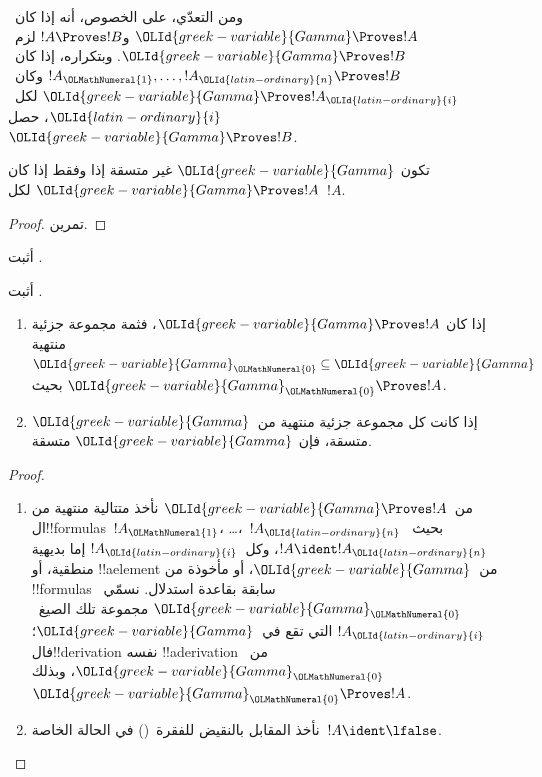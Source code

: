 \documentclass[../../../include/open-logic-section]{subfiles}
\begin{document}
ومن التعدّي، على الخصوص، أنه إذا كان~${\OLId{greek-variable}{Gamma}} \Proves !A$ و$!A
\Proves !B$ لزم~${\OLId{greek-variable}{Gamma}} \Proves !B$. وبتكراره، إذا كان~$!A_{\OLMathNumeral{1}},
\dots, !A_{\OLId{latin-ordinary}{n}} \Proves !B$ وكان~${\OLId{greek-variable}{Gamma}} \Proves !A_{\OLId{latin-ordinary}{i}}$ لكل~${\OLId{latin-ordinary}{i}}$،
حصل~${\OLId{greek-variable}{Gamma}} \Proves !B$.


\begin{prop}
تكون ${\OLId{greek-variable}{Gamma}}$ غير متسقة إذا وفقط إذا كان ${\OLId{greek-variable}{Gamma}} \Proves !A$ لكل~$!A$.
\end{prop}

\begin{proof}
تمرين.
\end{proof}

\begin{prob}
أثبت .
\end{prob}
\tagendprob

\begin{prob}
أثبت .
\end{prob}
\tagendprob

\begin{prop}[التراص]
  \begin{enumerate}
  \item إذا كان ${\OLId{greek-variable}{Gamma}} \Proves !A$، فثمة مجموعة جزئية منتهية ${\OLId{greek-variable}{Gamma}}_{\OLMathNumeral{0}}
    \subseteq {\OLId{greek-variable}{Gamma}}$ بحيث ${\OLId{greek-variable}{Gamma}}_{\OLMathNumeral{0}} \Proves !A$.
  \item إذا كانت كل مجموعة جزئية منتهية من~${\OLId{greek-variable}{Gamma}}$ متسقة، فإن
    ${\OLId{greek-variable}{Gamma}}$ متسقة.
  \end{enumerate}
\end{prop}

\begin{proof}
  \begin{enumerate}
    \item من~${\OLId{greek-variable}{Gamma}} \Proves !A$ نأخذ متتالية منتهية من
      ال!!{formula}s~$!A_{\OLMathNumeral{1}}$، \dots،~$!A_{\OLId{latin-ordinary}{n}}$ بحيث~$!A \ident !A_{\OLId{latin-ordinary}{n}}$،
      وكل~$!A_{\OLId{latin-ordinary}{i}}$ إما بديهية منطقية، أو !!a{element} من~${\OLId{greek-variable}{Gamma}}$،
      أو مأخوذة من !!{formula}s سابقة بقاعدة استدلال.
      نسمّي~${\OLId{greek-variable}{Gamma}}_{\OLMathNumeral{0}}$ مجموعة تلك الصيغ~$!A_{\OLId{latin-ordinary}{i}}$ التي تقع
      في~${\OLId{greek-variable}{Gamma}}$؛ فال!!{derivation} نفسه !!a{derivation}
      من~${\OLId{greek-variable}{Gamma}}_{\OLMathNumeral{0}}$، وبذلك~${\OLId{greek-variable}{Gamma}}_{\OLMathNumeral{0}} \Proves !A$.
    \item نأخذ المقابل بالنقيض للفقرة~() في الحالة الخاصة~$!A
      \ident \lfalse$.

\end{enumerate}
\end{proof}
\end{document}
